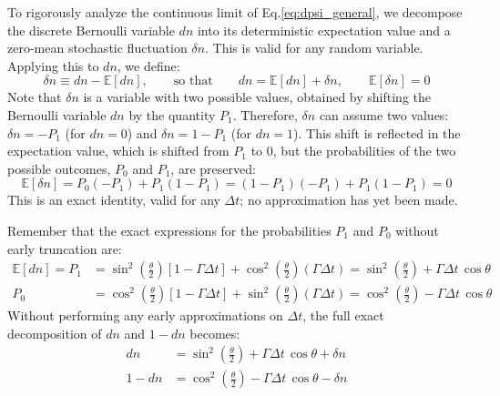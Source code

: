 \documentclass[a4paper,12pt]{article}
\begin{document}
To rigorously analyze the continuous limit of Eq.\ref{eq:dpsi_general}, we decompose 
the discrete Bernoulli variable $dn$ into its deterministic expectation value and a 
zero-mean stochastic fluctuation $\delta n$. This is valid for any random variable.
Applying this to $dn$, we define:
\begin{equation}
	\delta n \equiv dn - \mathbb{E}[dn], 
	\qquad \text{so that} \qquad 
	dn = \mathbb{E}[dn] + \delta n, 
	\qquad \mathbb{E}[\delta n] = 0
	\label{eq:centering_definition}
\end{equation}
Note that $\delta n$ is a variable with two possible values, obtained by shifting the Bernoulli variable $dn$ by the quantity $P_{1}$. Therefore, $\delta n$ can assume two values: $\delta n = -P_{1}$ (for $dn = 0$) and $\delta n = 1 - P_{1}$ (for $dn = 1$). This shift is reflected in the expectation value, which is shifted from $P_{1}$ to $0$, but the probabilities of the two possible outcomes, $P_{0}$ and $P_{1}$, are preserved:
\begin{equation*}
	\mathbb{E}[\delta n] = P_{0}(-P_{1}) + P_{1}(1-P_{1}) = (1 - P_{1})(-P_{1}) + P_{1}(1-P_{1}) = 0
\end{equation*}
This is an exact identity, valid for any $\Delta t$; no approximation has yet 
been made.

Remember that the exact expressions for the probabilities $P_1$ and $P_0$ without early truncation are:
\begin{align}
	\mathbb{E}[dn] = P_{1} &= \sin^{2}\left(\frac{\theta}{2}\right) [1-\Gamma\Delta t]
	+ \cos^{2}\left(\frac{\theta}{2}\right) (\Gamma\Delta t) = \sin^{2}\left(\frac{\theta}{2}\right) + \Gamma\Delta t \, \cos\theta \\
	P_{0} &= \cos^{2}\left(\frac{\theta}{2}\right) [1-\Gamma\Delta t]
	+ \sin^{2}\left(\frac{\theta}{2}\right) (\Gamma\Delta t) = \cos^{2}\left(\frac{\theta}{2}\right) - \Gamma\Delta t \, \cos\theta
\end{align}
Without performing any early approximations on $\Delta t$, the full exact decomposition of $dn$ and $1-dn$ becomes:
\begin{align}
	dn &= \sin^{2}\left(\frac{\theta}{2}\right) + \Gamma\Delta t \, \cos\theta + \delta n \label{eq:dn_exact_decomp} \\
	1 - dn &= \cos^{2}\left(\frac{\theta}{2}\right) - \Gamma\Delta t \, \cos\theta - \delta n
\end{align}
\end{document}
